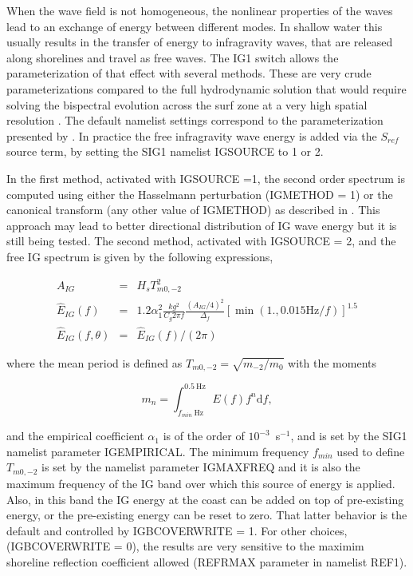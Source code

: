 When the wave field is not homogeneous, the nonlinear properties of the waves
lead to an exchange of energy between different modes. In shallow water this
usually results in the transfer of energy to infragravity waves, that are
released along shorelines and travel as free waves. The {\code IG1} switch
allows the parameterization of that effect with several methods.  These are
very crude parameterizations compared to the full hydrodynamic solution that
would require solving the bispectral evolution across the surf zone at a very
high spatial resolution \citep[e.g.][]{art:HB97}. The default namelist settings
correspond to the parameterization presented by \cite{art:Aea14}.
 In practice the free infragravity wave energy is
added via the $S_{ref}$ source term, by setting the {\code SIG1} namelist
{\code IGSOURCE} to 1 or 2.

In the first method, activated with {\code IGSOURCE =1}, the second order
spectrum is computed using either the Hasselmann perturbation ({\code IGMETHOD
= 1}) or the canonical transform (any other value of {\code IGMETHOD}) as described 
in \cite{art:Jan09}. This
approach may lead to better directional distribution of IG wave energy but it
is still being tested.  The second method, activated with {\code IGSOURCE =
2}, and the free IG spectrum is given by the following expressions,

\begin{eqnarray}
 A_{IG} & =&    H_s T_{m0,-2}^2\label{eq:IGfit0} \\
\widehat{E}_{IG}(f)& = & 1.2 \alpha_1^2 \frac{k g^2}{C_g 2 \pi f} \frac{(A_{IG}/4)^2}{\Delta_f}  
\left[\min( 1., 0.015\mathrm{Hz}/ f)\right]^{1.5} \label{eq:IGfit1} \\
 \widehat{E}_{IG}(f,\theta) & = & \widehat{E}_{IG}(f) / (2 \pi )
\label{eq:fit2} 
\end{eqnarray}

\noindent
where the mean period is defined as $ T_{m0,-2} =\sqrt{m_{-2}/m_{0}}$ with the
moments

\begin{equation}
 m_n= \int_{f_{min}~\mathrm{Hz}}^{0.5~\mathrm{Hz}} E(f) f^n {\mathrm d}f,\label{eq:mn}
\end{equation}

\noindent
and the empirical coefficient $\alpha_1$ is of the order of
$10^{-3}$~s$^{-1}$, and is set by the {\code SIG1} namelist parameter {\code
IGEMPIRICAL}. The minimum frequency $f_{min}$ used to define $ T_{m0,-2}$ is
set by the namelist parameter {\code IGMAXFREQ} and it is also the maximum
frequency of the IG band over which this source of energy is applied.  Also,
in this band the IG energy at the coast can be added on top of pre-existing
energy, or the pre-existing energy can be reset to zero. That latter behavior
is the default and controlled by {\code IGBCOVERWRITE = 1}. For other choices,
({\code IGBCOVERWRITE = 0}), the results are very sensitive to the maximim
shoreline reflection coefficient allowed ({\code REFRMAX} parameter in
namelist {\code REF1}).

